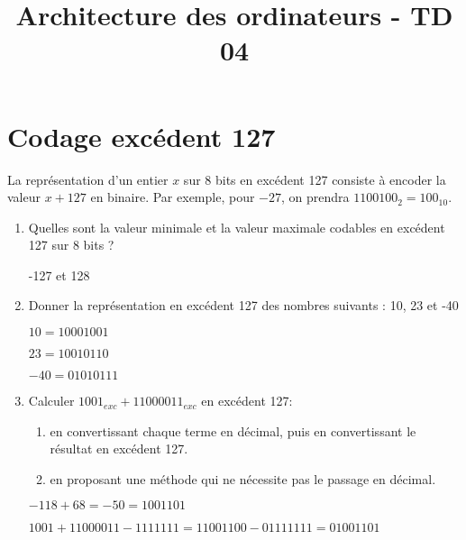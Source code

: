 \documentclass[a4paper,10pt]{exam}
\title{Architecture des ordinateurs - TD 04}
\author{}
\date{}
\begin{document}
\maketitle

\section{Codage excédent 127}

La repr\'esentation d'un entier $x$ sur 8 bits en excédent 127 consiste à
encoder la valeur $x + 127$ en binaire.
Par exemple, pour $-27$, on prendra $1100100_2 = 100_{10}$.

\begin{enumerate}
\item Quelles sont la valeur minimale et la valeur maximale codables en excédent 127
  sur 8 bits ?
  \begin{solution}
    -127 et 128
  \end{solution}
  \item Donner la représentation en excédent 127 des nombres suivants :
    10, 23 et -40
    \begin{solution}
      $10 = 10001001$

      $23 = 10010110$

      $-40 = 01010111$
    \end{solution}
  \item Calculer $1001_{exc} + 11000011_{exc}$ en excédent 127:
    \begin{enumerate}
      \item en convertissant chaque terme en décimal, puis en convertissant
        le résultat en excédent 127.
      \item en proposant une méthode qui ne nécessite pas le passage en décimal.
    \end{enumerate}
    \begin{solution}
      $-118 + 68 = -50 = 1001101$

      $1001 + 11000011 - 1111111 = 11001100 - 01111111 = 01001101 $
    \end{solution}
\end{enumerate}
\end{document}
